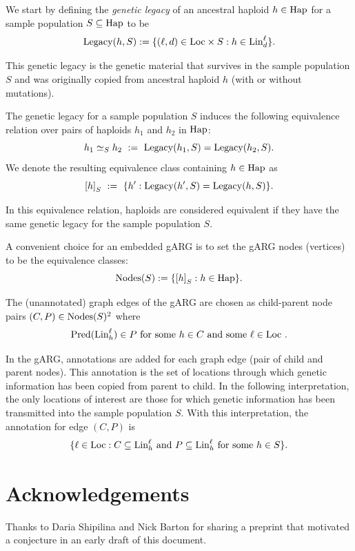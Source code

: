 We start by defining the \emph{genetic legacy} of an ancestral haploid
$h \in \mathrm{Hap}$ for a sample population $S \subseteq \mathrm{Hap}$ to be
\[
  \mathrm{Legacy}(h, S) := \{ (\ell, d) \in \mathrm{Loc} \times S : h \in \mathrm{Lin}^\ell_d \}
\text{.}
\]

This genetic legacy is the genetic material that survives in the
sample population $S$ and was originally copied from ancestral haploid $h$
(with or without mutations).

The genetic legacy for a sample population $S$ induces the following
equivalence relation over pairs of haploids $h_1$ and $h_2$ in
$\mathrm{Hap}$:
\[
h_1 \simeq_S h_2 \ := \ \mathrm{Legacy}(h_1, S) = \mathrm{Legacy}(h_2, S)
\text{.}
\]
We denote the resulting equivalence class containing $h \in \mathrm{Hap}$ as
\[
{[h]}_S \ := \ \{ h' : \mathrm{Legacy}(h', S) = \mathrm{Legacy}(h, S) \}
\text{.}
\]

In this equivalence relation, haploids are considered equivalent if
they have the same genetic legacy for the sample population $S$.

A convenient choice for an embedded gARG \cite{wong_general_2024} is
to set the gARG nodes (vertices) to be the equivalence classes:
\[
   \mathrm{Nodes}(S) := \{ {[h]}_S : h \in \mathrm{Hap} \}
\text{.}
\]

The (unannotated) graph edges of the gARG are chosen as child-parent
node pairs $(C, P) \in \mathrm{Nodes}(S)^2$ where
\[
  \mathrm{Pred}(\mathrm{Lin}^\ell_h) \in P \text{ for some $h \in C$ and some $\ell \in \mathrm{Loc}$ .}
\]

In the gARG, annotations are added for each graph edge (pair of child
and parent nodes). This annotation is the set of locations through which
genetic information has been copied from parent to child. In the
following interpretation, the only locations of interest are those for
which genetic information has been transmitted into the sample
population $S$. With this interpretation, the annotation for edge
$(C,P)$ is
\[
  \{ \ell \in \mathrm{Loc} :
     C \subseteq \mathrm{Lin}^\ell_h \text{ and } P \subseteq \mathrm{Lin}^\ell_h \text{ for some $h \in S$}
  \}
\text{.}
\]

\section{Acknowledgements}

Thanks to Daria Shipilina and Nick Barton for sharing a preprint
\cite{shipilina_origin_2023} that motivated a conjecture in an early draft of this
document.

\printbibliography


